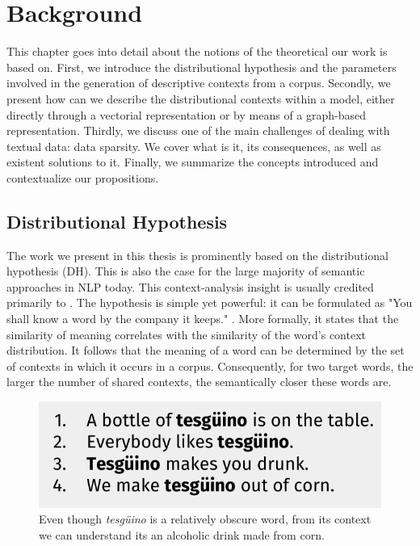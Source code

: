 \chapter{Background}
\label{chap:backgnd}
\begin{abstractchap}
This chapter goes into detail about the notions of the theoretical our work is based on. First, we introduce the distributional hypothesis and the parameters involved in the generation of descriptive contexts from a corpus. Secondly, we present how can we describe the distributional contexts within a model, either directly through a vectorial representation or by means of a graph-based representation. Thirdly, we discuss one of the main challenges of dealing with textual data: data sparsity. We cover what is it, its consequences, as well as existent solutions to it. Finally, we summarize the concepts introduced and contextualize our propositions.
\end{abstractchap}
\minitoc

\section{Distributional Hypothesis}
The work we present in this thesis is prominently based on the distributional hypothesis (DH). This is also the case for the large majority of semantic approaches in NLP today. This context-analysis insight is usually credited primarily to \cite{harris1954}. The hypothesis is simple yet powerful: it can be formulated as "You shall know a word by the company it keeps." \cite{firth57synopsis}. More formally, it states that the similarity of meaning correlates with the similarity of the word's context distribution. It follows that the meaning of a word can be determined by the set of contexts in which it occurs in a corpus. Consequently, for two target words, the larger the number of shared contexts, the semantically closer these words are. 

\begin{figure}
\centering
\includegraphics[width=.6\linewidth]{images/Chapitre2/tejuino.pdf}
\caption{Even though \textit{tesg\"{u}ino} is a relatively obscure word, from its context we can understand its an alcoholic drink made from corn.}
\label{fig:tejuino}
\end{figure}


